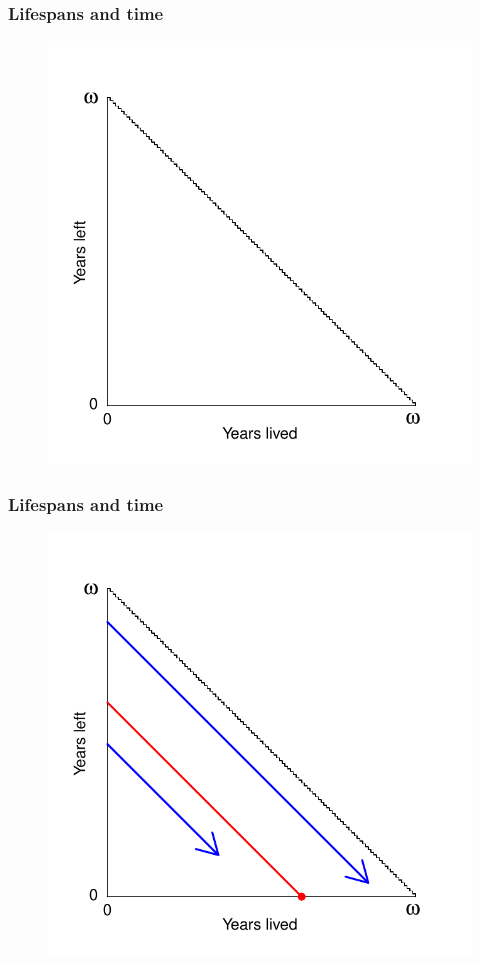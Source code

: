 \documentclass{beamer}
\begin{document}
\begin{frame}
\frametitle{Lifespans and time}
\vspace{-1cm}
\begin{figure}
\includegraphics[scale=.7]{Figures/Triangle1}
\end{figure}
\end{frame}
\begin{frame}
\frametitle{Lifespans and time}
\vspace{-1cm}
\begin{figure}
\includegraphics[scale=.7]{Figures/Triangle2}
\end{figure}
\end{frame}
\end{document}
